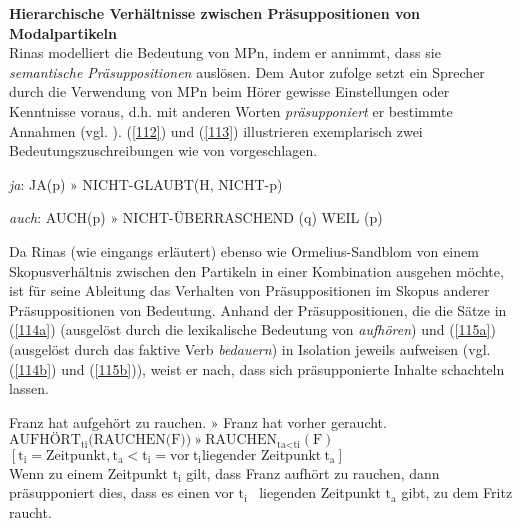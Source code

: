 \noindent
\textbf{Hierarchische Verhältnisse zwischen Präsuppositionen von Modalpartikeln}\\
Rinas modelliert die Bedeutung von MPn, indem er annimmt, dass sie \textit{semanti\-sche Präsuppositionen}  auslösen. Dem Autor zufolge setzt ein Sprecher durch die Verwendung von MPn beim Hörer gewisse Einstellungen oder Kenntnisse voraus, d.h. mit anderen Worten \textit{präsupponiert} er bestimmte Annahmen (vgl. \citealt[421-422]{Rinas2007}). (\ref{112}) und (\ref{113}) illustrieren exemplarisch zwei Bedeutungszuschreibungen wie von \citet[420 bzw. 425]{Rinas2007} vorgeschlagen.  

\begin{exe}
	\ex\label{112} 
			\textit{ja}: JA(p) $»$ NICHT-GLAUBT(H, NICHT-p)	
\end{exe}
\vspace{-0.65cm}
\begin{exe}
	\ex\label{113} 
			\textit{auch}: AUCH(p) $»$ NICHT-ÜBERRASCHEND (q) WEIL (p)	
\end{exe}
Da Rinas (wie eingangs erläutert) ebenso wie Ormelius-Sandblom von einem Skopusverhältnis  zwischen den Partikeln in einer Kombination ausgehen möchte, ist für seine Ableitung das Verhalten von Präsuppositionen im Skopus anderer Präsuppositionen von Bedeutung. Anhand der Präsuppositionen, die die Sätze in (\ref{114a}) (ausgelöst durch die lexikalische Bedeutung von \textit{aufhören}) und (\ref{115a}) (ausgelöst durch das faktive Verb \textit{bedauern}) in Isolation jeweils aufweisen (vgl. (\ref{114b}) und (\ref{115b})), weist er nach, dass sich präsupponierte Inhalte schachteln lassen. 

\begin{exe}
	\ex\label{114} 
		\begin{xlist}	
			\ex\label{114a} Franz hat aufgehört zu rauchen. $»$ Franz hat vorher geraucht.
			\ex\label{114b} $\textrm{AUFHÖRT}_{\textrm{ti}}(\textrm{RAUCHEN(F))} \ » \ \textrm{RAUCHEN}_{\textrm{ta} < \textrm{ti}}(\textrm{F})$ \\
			$[\textrm{t}_{\textrm{i}} = \text{Zeitpunkt}, \textrm{t}_{\textrm{a}} < \textrm{t}_{\textrm{i}} = \text{vor} \ \textrm{t}_{\textrm{i}}  \text{liegender Zeitpunkt} \ \textrm{t}_{\textrm{a}}]$ \\
			\glq Wenn zu einem Zeitpunkt $\textrm{t}_{\textrm{i}}$ gilt, dass Franz aufhört zu rauchen, dann präsupponiert dies, dass es einen vor $\textrm{t}_{\textrm{i}}$ \ liegenden Zeitpunkt $\textrm{t}_{\textrm{a}}$ gibt, zu dem Fritz raucht.\grq {}
		\end{xlist}
\end{exe}

